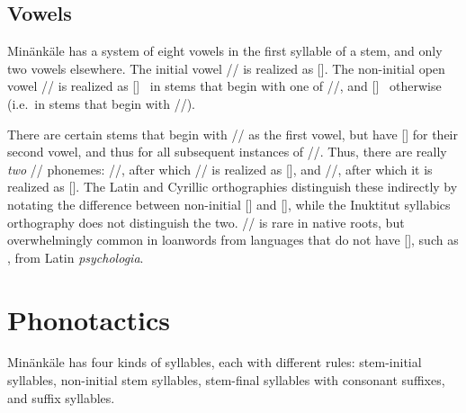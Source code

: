 \subsection{Vowels}\label{s:vowels}
Min\"ank\"ale has a system of eight vowels in the
first syllable of a stem, and only two vowels elsewhere. The initial vowel
// is realized as []. The non-initial open vowel // is
realized as []~ in stems that begin with one of
//, and []~ otherwise (i.e.~in stems that begin
with //).

There are certain stems that begin with // as the first vowel, but have
[] for their second vowel, and thus for all subsequent instances of
//. Thus, there are really \emph{two} // phonemes:
//, after which // is realized as [], and
//, after which it is realized as []. The Latin and
Cyrillic orthographies distinguish these indirectly by notating the difference
between non-initial [] and [], while the Inuktitut syllabics
orthography does not distinguish the two. // is rare in native
roots, but overwhelmingly common in loanwords from languages that do not have
[], such as , from Latin \textit{psychologia}.

\section{Phonotactics}
Min\"ank\"ale has four kinds of syllables, each with different rules:
stem-initial syllables, non-initial stem syllables, stem-final syllables with
consonant suffixes, and suffix syllables.

